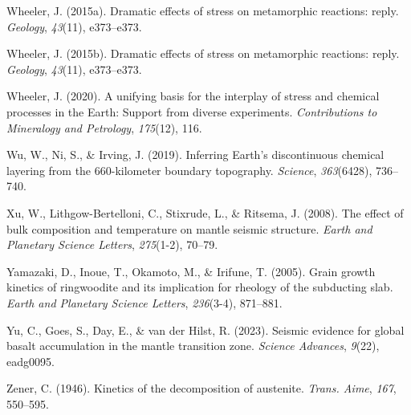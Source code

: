 \documentclass[draft,linenumbers]{agujournal2019}
\newlength{\cslhangindent}
\newenvironment{CSLReferences}[2]
 {\begin{list}{}{
  \setlength{\itemindent}{0pt}
  \setlength{\leftmargin}{0pt}
  \setlength{\parsep}{0pt}
  \ifodd #1
   \setlength{\leftmargin}{\cslhangindent}
   \setlength{\itemindent}{-\cslhangindent}
  \fi
  \setlength{\itemsep}{#2\baselineskip}
  }
  \item\relax}
 {\end{list}}
\begin{document}
\begin{CSLReferences}{1}{0}
Wheeler, J. (2015a). Dramatic effects of stress on metamorphic
reactions: reply. \emph{Geology}, \emph{43}(11), e373--e373.

Wheeler, J. (2015b). Dramatic effects of stress on metamorphic
reactions: reply. \emph{Geology}, \emph{43}(11), e373--e373.

Wheeler, J. (2020). A unifying basis for the interplay of stress and
chemical processes in the {Earth}: Support from diverse experiments.
\emph{Contributions to Mineralogy and Petrology}, \emph{175}(12), 116.

Wu, W., Ni, S., \& Irving, J. (2019). Inferring {Earth}'s discontinuous
chemical layering from the 660-kilometer boundary topography.
\emph{Science}, \emph{363}(6428), 736--740.

Xu, W., Lithgow-Bertelloni, C., Stixrude, L., \& Ritsema, J. (2008). The
effect of bulk composition and temperature on mantle seismic structure.
\emph{Earth and Planetary Science Letters}, \emph{275}(1-2), 70--79.

Yamazaki, D., Inoue, T., Okamoto, M., \& Irifune, T. (2005). Grain
growth kinetics of ringwoodite and its implication for rheology of the
subducting slab. \emph{Earth and Planetary Science Letters},
\emph{236}(3-4), 871--881.

{Yu, C., Goes, S., Day, E., \& van der Hilst, R.} (2023). Seismic
evidence for global basalt accumulation in the mantle transition zone.
\emph{Science Advances}, \emph{9}(22), eadg0095.

Zener, C. (1946). Kinetics of the decomposition of austenite.
\emph{Trans. Aime}, \emph{167}, 550--595.

\end{CSLReferences}
\end{document}
